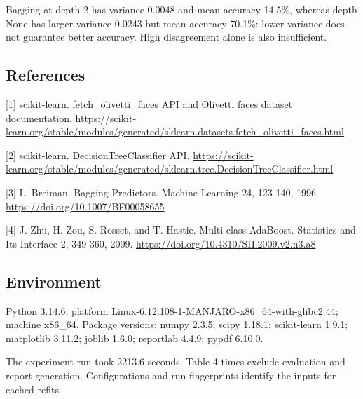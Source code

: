 \documentclass[10pt,twocolumn,letterpaper]{article}
\begin{document}
Bagging at depth 2 has variance 0.0048 and mean accuracy 14.5\%, whereas depth None has larger variance 0.0243 but mean accuracy 70.1\%: lower variance does not guarantee better accuracy. High disagreement alone is also insufficient.

\subsection*{References}
[1] scikit-learn. fetch\_olivetti\_faces API and Olivetti faces dataset documentation. \url{https://scikit-learn.org/stable/modules/generated/sklearn.datasets.fetch_olivetti_faces.html}

[2] scikit-learn. DecisionTreeClassifier API. \url{https://scikit-learn.org/stable/modules/generated/sklearn.tree.DecisionTreeClassifier.html}

[3] L. Breiman. Bagging Predictors. Machine Learning 24, 123-140, 1996. \url{https://doi.org/10.1007/BF00058655}

[4] J. Zhu, H. Zou, S. Rosset, and T. Hastie. Multi-class AdaBoost. Statistics and Its Interface 2, 349-360, 2009. \url{https://doi.org/10.4310/SII.2009.v2.n3.a8}

\subsection*{Environment}
Python 3.14.6; platform Linux-6.12.108-1-MANJARO-x86\_64-with-glibc2.44; machine x86\_64. Package versions: numpy 2.3.5; scipy 1.18.1; scikit-learn 1.9.1; matplotlib 3.11.2; joblib 1.6.0; reportlab 4.4.9; pypdf 6.10.0.

The experiment run took 2213.6 seconds. Table 4 times exclude evaluation and report generation. Configurations and run fingerprints identify the inputs for cached refits.
\end{document}
